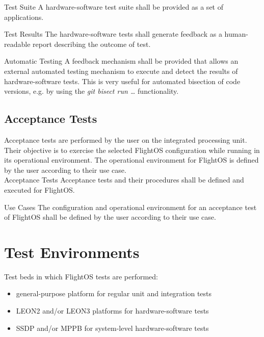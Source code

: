  {Test Suite}{%
A hardware-software test suite shall be provided as a set of applications.
}{}

 {Test Results}{%
The hardware-software tests shall generate feedback as a human-readable %
report describing the outcome of test.%
}{}


 {Automatic Testing}{%
A feedback mechanism shall be provided that allows an external automated %
testing mechanism to execute and detect the results of hardware-software tests.%
}{This is very useful for automated bisection of code versions, e.g. by %
using the \emph{git bisect run \ldots} functionality.}%


\section {Acceptance Tests}

Acceptance tests are performed by the user on the integrated processing unit.
Their objective is to exercise the selected FlightOS configuration while running
in its operational environment. The operational environment for FlightOS is
defined by the user according to their use case.\\



 {Acceptance Tests}{%
Acceptance tests and their procedures shall be defined and executed for FlightOS.
}{}

 {Use Cases}{%
The configuration and operational environment for an acceptance test of FlightOS
shall be defined by the user according to their use case.
}{}




\chapter{Test Environments}

Test beds in which FlightOS tests are performed:

\begin{itemize}
	\item general-purpose platform for regular unit and integration tests
	\item \gls{LEON2} and/or \gls{LEON3} platforms for hardware-software tests
	\item \gls{SSDP} and/or \gls{MPPB} for system-level hardware-software tests
\end{itemize}

